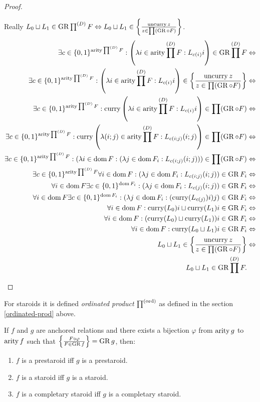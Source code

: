 \begin{proof}
\begin{widedisorder}
Really $L_{0}\sqcup L_{1}\in\operatorname{GR}\prod^{(D)}F\Leftrightarrow L_{0}\sqcup L_{1}\in\left\{ \frac{\operatorname{uncurry} z}{z\in\prod(\operatorname{GR}\circ F)}\right\}$.
\begin{align*}
\exists c\in\{0,1\}^{\operatorname{arity}\prod^{(D)}F}:\left(\lambda i\in\operatorname{arity}\prod^{(D)}F:L_{c(i_{})}i\right)\in\operatorname{GR}\prod^{(D)}F & \Leftrightarrow\\
\exists c\in\{0,1\}^{\operatorname{arity}\prod^{(D)}F}:\left(\lambda i\in\operatorname{arity}\prod^{(D)}F:L_{c(i_{})}i\right)\in\left\{ \frac{\operatorname{uncurry} z}{z\in\prod(\operatorname{GR}\circ F)}\right\} & \Leftrightarrow\\
\exists c\in\{0,1\}^{\operatorname{arity}\prod^{(D)}F}:\operatorname{curry}\left(\lambda i\in\operatorname{arity}\prod^{(D)}F:L_{c(i_{})}i\right)\in\prod(\operatorname{GR}\circ F) & \Leftrightarrow\\
\exists c\in\{0,1\}^{\operatorname{arity}\prod^{(D)}F}:\operatorname{curry}\left(\lambda(i;j)\in\operatorname{arity}\prod^{(D)}F:L_{c(i;j)}(i;j)\right)\in\prod(\operatorname{GR}\circ F) & \Leftrightarrow\\
\exists c\in\{0,1\}^{\operatorname{arity}\prod^{(D)}F}:(\lambda i\in\operatorname{dom} F:(\lambda j\in\operatorname{dom} F_{i}:L_{c(i;j)}(i;j)))\in\prod(\operatorname{GR}\circ F) & \Leftrightarrow\\
\exists c\in\{0,1\}^{\operatorname{arity}\prod^{(D)}F}\forall i\in\operatorname{dom} F:(\lambda j\in\operatorname{dom} F_{i}:L_{c(i;j)}(i;j))\in\operatorname{GR} F_{i} & \Leftrightarrow\\
\forall i\in\operatorname{dom} F\exists c\in\{0,1\}^{\operatorname{dom} F_{i}}:(\lambda j\in\operatorname{dom} F_{i}:L_{c(j)}(i;j))\in\operatorname{GR} F_{i} & \Leftrightarrow\\
\forall i\in\operatorname{dom} F\exists c\in\{0,1\}^{\operatorname{dom} F_{i}}:(\lambda j\in\operatorname{dom} F_{i}:(\operatorname{curry}(L_{c(j)})i)j)\in\operatorname{GR} F_{i} & \Leftrightarrow\\
\forall i\in\operatorname{dom} F:\operatorname{curry}(L_{0})i\sqcup\operatorname{curry}(L_{1})i\in\operatorname{GR} F_{i} & \Leftrightarrow\\
\forall i\in\operatorname{dom} F:(\operatorname{curry}(L_{0})\sqcup\operatorname{curry}(L_{1}))i\in\operatorname{GR} F_{i} & \Leftrightarrow\\
\forall i\in\operatorname{dom} F:\operatorname{curry}(L_{0}\sqcup L_{1})i\in\operatorname{GR} F_{i} & \Leftrightarrow\\
L_{0}\sqcup L_{1}\in\left\{ \frac{\operatorname{uncurry} z}{z\in\prod(\operatorname{GR}\circ F)}\right\} & \Leftrightarrow\\
L_{0}\sqcup L_{1}\in\operatorname{GR}\prod^{(D)}F.
\end{align*}


\end{widedisorder}
\end{proof}
For staroids it is defined \emph{ordinated product} $\prod^{(\operatorname{ord})}$
as defined in the section \ref{ordinated-prod} above.
\begin{obvious}
If $f$ and $g$ are anchored relations and there exists a bijection
$\varphi$ from $\operatorname{arity} g$ to $\operatorname{arity} f$ such that $\left\{ \frac{F\circ\varphi}{F\in\operatorname{GR} f}\right\}=\operatorname{GR} g$,
then: 
\begin{enumerate}
\item $f$ is a prestaroid iff $g$ is a prestaroid.
\item $f$ is a staroid iff $g$ is a staroid.
\item $f$ is a completary staroid iff $g$ is a completary staroid.
\end{enumerate}
\end{obvious}
